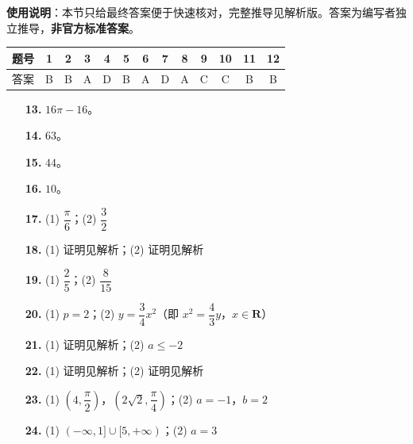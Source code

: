 
\begin{gknotice}
\textbf{使用说明}：本节只给最终答案便于快速核对，完整推导见解析版。答案为编写者独立推导，\textbf{非官方标准答案}。
\end{gknotice}

\begin{center}\begin{tabular}{ccccccccccccc}
\toprule
题号 & 1 & 2 & 3 & 4 & 5 & 6 & 7 & 8 & 9 & 10 & 11 & 12 \\
\midrule
答案 & B & B & A & D & B & A & D & A & C & C & B & B \\
\bottomrule
\end{tabular}\end{center}

\begin{itemize}[leftmargin=2.6em]
  \item[\textbf{13.}] $16\pi-16$。
  \item[\textbf{14.}] $63$。
  \item[\textbf{15.}] $44$。
  \item[\textbf{16.}] $10$。
\end{itemize}

\begin{itemize}[leftmargin=2.6em]
  \item[\textbf{17.}] (1) $\dfrac\pi6$；(2) $\dfrac32$
  \item[\textbf{18.}] (1) 证明见解析；(2) 证明见解析
  \item[\textbf{19.}] (1) $\dfrac25$；(2) $\dfrac8{15}$
  \item[\textbf{20.}] (1) $p=2$；(2) $y=\dfrac34x^2$（即 $x^2=\dfrac43y$，$x\in\mathbf R$）
  \item[\textbf{21.}] (1) 证明见解析；(2) $a\leqslant-2$
  \item[\textbf{22.}] (1) 证明见解析；(2) 证明见解析
  \item[\textbf{23.}] (1) $(4,\dfrac\pi2)$，$(2\sqrt2,\dfrac\pi4)$；(2) $a=-1$，$b=2$
  \item[\textbf{24.}] (1) $(-\infty,1]\cup[5,+\infty)$；(2) $a=3$
\end{itemize}
